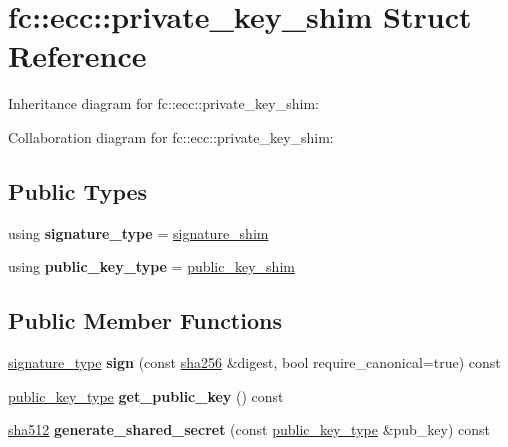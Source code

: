 \hypertarget{structfc_1_1ecc_1_1private__key__shim}{}\section{fc\+:\+:ecc\+:\+:private\+\_\+key\+\_\+shim Struct Reference}
\label{structfc_1_1ecc_1_1private__key__shim}


Inheritance diagram for fc\+:\+:ecc\+:\+:private\+\_\+key\+\_\+shim\+:


Collaboration diagram for fc\+:\+:ecc\+:\+:private\+\_\+key\+\_\+shim\+:
\subsection*{Public Types}
\begin{DoxyCompactItemize}
\item 
\mbox{\label{structfc_1_1ecc_1_1private__key__shim_a7a9d6c460a3ded738e1716dc9e4d71cf}} 
using {\bfseries signature\+\_\+type} = \mbox{\hyperlink{structfc_1_1ecc_1_1signature__shim}{signature\+\_\+shim}}
\item 
\mbox{\label{structfc_1_1ecc_1_1private__key__shim_a1f87277511bb725a3781c3dcb53b1c76}} 
using {\bfseries public\+\_\+key\+\_\+type} = \mbox{\hyperlink{structfc_1_1ecc_1_1public__key__shim}{public\+\_\+key\+\_\+shim}}
\end{DoxyCompactItemize}
\subsection*{Public Member Functions}
\begin{DoxyCompactItemize}
\item 
\mbox{\label{structfc_1_1ecc_1_1private__key__shim_a30c56fdfcd1fc63bbe5107c08a4cecf0}} 
\mbox{\hyperlink{structfc_1_1ecc_1_1signature__shim}{signature\+\_\+type}} {\bfseries sign} (const \mbox{\hyperlink{classfc_1_1sha256}{sha256}} \&digest, bool require\+\_\+canonical=true) const
\item 
\mbox{\label{structfc_1_1ecc_1_1private__key__shim_a004aff01317662b1f5f6ea59635c9746}} 
\mbox{\hyperlink{structfc_1_1ecc_1_1public__key__shim}{public\+\_\+key\+\_\+type}} {\bfseries get\+\_\+public\+\_\+key} () const
\item 
\mbox{\label{structfc_1_1ecc_1_1private__key__shim_ab226b9bd48919066953c147e93d6101c}} 
\mbox{\hyperlink{classfc_1_1sha512}{sha512}} {\bfseries generate\+\_\+shared\+\_\+secret} (const \mbox{\hyperlink{structfc_1_1ecc_1_1public__key__shim}{public\+\_\+key\+\_\+type}} \&pub\+\_\+key) const
\end{DoxyCompactItemize}
